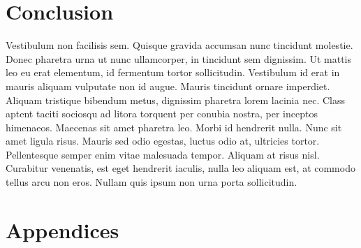 \documentclass[a4paper,12pt,twocolumn]{article}
\begin{document}
	

\section{Conclusion}
	Vestibulum non facilisis sem. Quisque gravida accumsan nunc tincidunt molestie. Donec pharetra urna ut nunc ullamcorper, in tincidunt sem dignissim. Ut mattis leo eu erat elementum, id fermentum tortor sollicitudin. Vestibulum id erat in mauris aliquam vulputate non id augue. Mauris tincidunt ornare imperdiet. Aliquam tristique bibendum metus, dignissim pharetra lorem lacinia nec. Class aptent taciti sociosqu ad litora torquent per conubia nostra, per inceptos himenaeos. Maecenas sit amet pharetra leo. Morbi id hendrerit nulla. Nunc sit amet ligula risus. Mauris sed odio egestas, luctus odio at, ultricies tortor. Pellentesque semper enim vitae malesuada tempor. Aliquam at risus nisl. Curabitur venenatis, est eget hendrerit iaculis, nulla leo aliquam est, at commodo tellus arcu non eros. Nullam quis ipsum non urna porta sollicitudin.

\newpage
\begin{thebibliography}{}
	
	
\end{thebibliography}

	

\newpage

\section*{Appendices}
	
	
\end{document}
